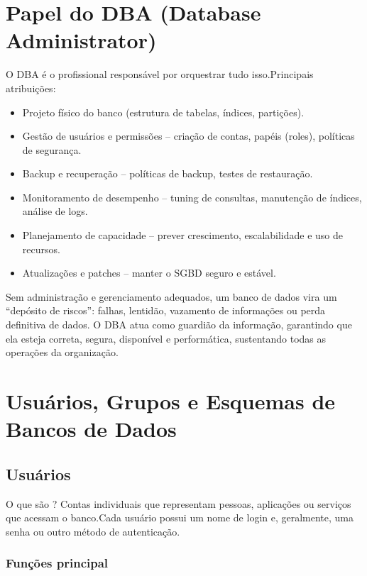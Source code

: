 \documentclass[
]{book}
\begin{document}
\section{Papel do DBA (Database Administrator)}\label{papel-do-dba-database-administrator}

O DBA é o profissional responsável por orquestrar tudo isso.Principais atribuições:

\begin{itemize}
\item
  Projeto físico do banco (estrutura de tabelas, índices, partições).
\item
  Gestão de usuários e permissões -- criação de contas, papéis (roles), políticas de segurança.
\item
  Backup e recuperação -- políticas de backup, testes de restauração.
\item
  Monitoramento de desempenho -- tuning de consultas, manutenção de índices, análise de logs.
\item
  Planejamento de capacidade -- prever crescimento, escalabilidade e uso de recursos.
\item
  Atualizações e patches -- manter o SGBD seguro e estável.
\end{itemize}

Sem administração e gerenciamento adequados, um banco de dados vira um ``depósito de riscos'': falhas, lentidão, vazamento de informações ou perda definitiva de dados. O DBA atua como guardião da informação, garantindo que ela esteja correta, segura, disponível e performática, sustentando todas as operações da organização.

\section{Usuários, Grupos e Esquemas de Bancos de Dados}\label{usuuxe1rios-grupos-e-esquemas-de-bancos-de-dados}

\subsection{Usuários}\label{usuuxe1rios}

O que são ? Contas individuais que representam pessoas, aplicações ou serviços que acessam o banco.Cada usuário possui um nome de login e, geralmente, uma senha ou outro método de autenticação.

\subsubsection{Funções principal}\label{funuxe7uxf5es-principal}
\end{document}
